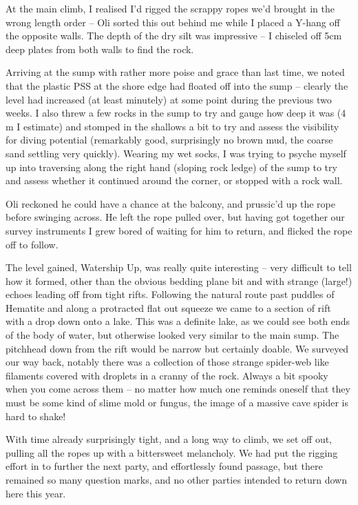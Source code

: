 At the main climb, I realised I'd rigged the scrappy ropes we'd brought
in the wrong length order -- Oli sorted this out behind me while I
placed a Y-hang off the opposite walls. The depth of the dry silt was
impressive -- I chiseled off 5cm deep plates from both walls to find the
rock.

Arriving at the sump with rather more poise and grace than last time, we
noted that the plastic PSS at the shore edge had floated off into the
sump -- clearly the level had increased (at least minutely) at some
point during the previous two weeks. I also threw a few rocks in the
sump to try and gauge how deep it was (4 m I estimate) and stomped in
the shallows a bit to try and assess the visibility for diving potential
(remarkably good, surprisingly no brown mud, the coarse sand settling
very quickly). Wearing my wet socks, I was trying to psyche myself up
into traversing along the right hand (sloping rock ledge) of the sump to
try and assess whether it continued around the corner, or stopped with a
rock wall.

Oli reckoned he could have a chance at the balcony, and prussic'd up the
rope before swinging across. He left the rope pulled over, but having
got together our survey instruments I grew bored of waiting for him to
return, and flicked the rope off to follow.

The level gained, Watership Up, was really quite interesting -- very
difficult to tell how it formed, other than the obvious bedding plane
bit and with strange (large!) echoes leading off from tight rifts.
Following the natural route past puddles of Hematite and along a
protracted flat out squeeze we came to a section of rift with a drop
down onto a lake. This was a definite lake, as we could see both ends of
the body of water, but otherwise looked very similar to the main sump.
The pitchhead down from the rift would be narrow but certainly doable.
We surveyed our way back, notably there was a collection of those
strange spider-web like filaments covered with droplets in a cranny of
the rock. Always a bit spooky when you come across them -- no matter how
much one reminds oneself that they must be some kind of slime mold or
fungus, the image of a massive cave spider is hard to shake!

With time already surprisingly tight, and a long way to climb, we set
off out, pulling all the ropes up with a bittersweet melancholy. We had
put the rigging effort in to further the next party, and effortlessly
found passage, but there remained so many question marks, and no other
parties intended to return down here this year.

